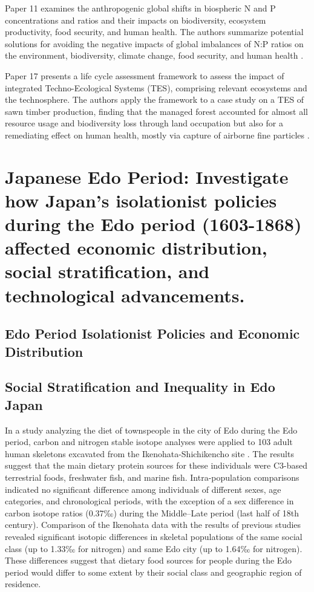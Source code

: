 \documentclass{article}
\begin{document}
Paper 11 examines the anthropogenic global shifts in biospheric N and P concentrations and ratios and their impacts on biodiversity, ecosystem productivity, food security, and human health. The authors summarize potential solutions for avoiding the negative impacts of global imbalances of N:P ratios on the environment, biodiversity, climate change, food security, and human health \cite{Maruping2015MotivatingET}.

Paper 17 presents a life cycle assessment framework to assess the impact of integrated Techno-Ecological Systems (TES), comprising relevant ecosystems and the technosphere. The authors apply the framework to a case study on a TES of sawn timber production, finding that the managed forest accounted for almost all resource usage and biodiversity loss through land occupation but also for a remediating effect on human health, mostly via capture of airborne fine particles \cite{Farrell2017InvestigationIT}.


\section{Japanese Edo Period: Investigate how Japan's isolationist policies during the Edo period (1603-1868) affected economic distribution, social stratification, and technological advancements.}

\subsection{Edo Period Isolationist Policies and Economic Distribution}

\subsection{Social Stratification and Inequality in Edo Japan}

In a study analyzing the diet of townspeople in the city of Edo during the Edo period, carbon and nitrogen stable isotope analyses were applied to 103 adult human skeletons excavated from the Ikenohata-Shichikencho site \cite{Tsutaya2016TheDO}. The results suggest that the main dietary protein sources for these individuals were C3-based terrestrial foods, freshwater fish, and marine fish. Intra-population comparisons indicated no significant difference among individuals of different sexes, age categories, and chronological periods, with the exception of a sex difference in carbon isotope ratios (0.37‰) during the Middle–Late period (last half of 18th century). Comparison of the Ikenohata data with the results of previous studies revealed significant isotopic differences in skeletal populations of the same social class (up to 1.33‰ for nitrogen) and same Edo city (up to 1.64‰ for nitrogen). These differences suggest that dietary food sources for people during the Edo period would differ to some extent by their social class and geographic region of residence.
\end{document}
